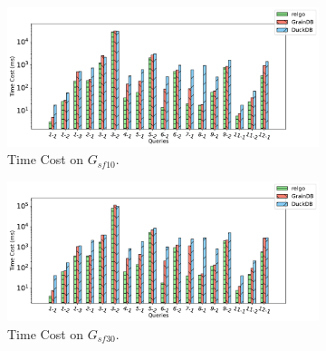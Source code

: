 
\begin{figure}[ht]
    \centering
    \begin{subfigure}[b]{0.45\linewidth}
        \centering
        \includegraphics[width=\linewidth]{./figures/exp/e2e_sf10.pdf}
        \caption{Time Cost on $G_{sf10}$.}
        \label{fig:exp-e2e-sf10}
    \end{subfigure}
    \begin{subfigure}[b]{0.45\linewidth}
        \centering
        \includegraphics[width=\linewidth]{./figures/exp/e2e_sf30.pdf}
        \caption{Time Cost on $G_{sf30}$.}
        \label{fig:exp-e2e-sf30}
    \end{subfigure}
    \begin{subfigure}[b]{0.6\linewidth}

\end{subfigure}
\end{figure}
